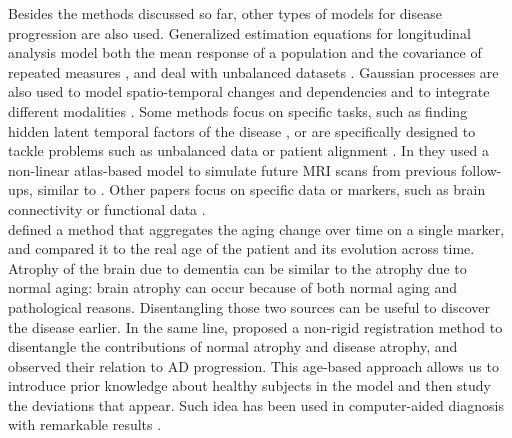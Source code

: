 Besides the methods discussed so far, other types of models for disease progression are also used.  Generalized estimation equations for longitudinal analysis \cite{liang1986longitudinal} model both the mean response of a population and the covariance of repeated measures \cite{Zhang2014}, and deal with unbalanced datasets \cite{Guillaume2014,Li2013}. Gaussian processes are also used to model spatio-temporal changes and dependencies \cite{Hyun2016,Lorenzi2015b,Lorenzi2015c} and to integrate different modalities \cite{Lorenzi2017}. Some methods focus on specific tasks, such as finding hidden latent temporal factors of the disease \cite{Chen2012,Wachinger2017}, or are specifically designed to tackle problems such as unbalanced data or patient alignment \cite{Bilgel2018,Dawson2016,Goyal2018,Li2013}. In \cite{Liu2015} they used a non-linear atlas-based model to simulate future MRI scans from previous follow-ups, similar to \cite{Lorenzi2015c}. Other papers focus on specific data or markers, such as brain connectivity \cite{Chenhui2014} or functional data \cite{Li2017b}.  \\

\cite{Franke2010,Franke2012,Gaser2013} defined a method that aggregates the aging change over time on a single marker, and compared it to the real age of the patient and its evolution across time. Atrophy of the brain due to dementia can be similar to the atrophy due to normal aging: brain atrophy can occur because of both normal aging and pathological reasons. Disentangling those two sources can be useful to discover the disease earlier. In the same line, \cite{Lorenzi2014} proposed a non-rigid registration method to disentangle the contributions of normal atrophy and disease atrophy, and observed their relation to AD progression. This age-based approach allows us to introduce prior knowledge about healthy subjects in the model and then study the deviations that appear. Such idea has been used in computer-aided diagnosis with remarkable results \cite{Gavidia-Bovadilla2017}. \\

